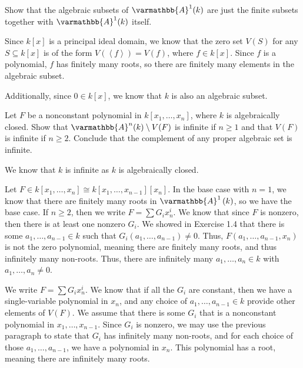 \documentclass[10pt]{mypackage}
\renewcommand*{\mathbb}[1]{\varmathbb{#1}}
\newcommand{\A}{\mathbb{A}}
\begin{document}
\begin{exercise}[Exercise 1.8]
  Show that the algebraic subsets of $\A^1(k)$ are just the finite subsets together with $\A^1(k)$ itself.
\end{exercise}
\begin{solution}
  Since $k\left[x\right]$ is a principal ideal domain, we know that the zero set $V(S)$ for any $S\subseteq k\left[x\right]$ is of the form $V\left(\left\langle f \right\rangle\right) = V\left(f\right)$, where $f\in k\left[x\right]$. Since $f$ is a polynomial, $f$ has finitely many roots, so there are finitely many elements in the algebraic subset.\newline

  Additionally, since $0\in k\left[x\right]$, we know that $k$ is also an algebraic subset.
\end{solution}
\begin{exercise}[Exercise 1.14]
Let $F$ be a nonconstant polynomial in $k\left[x_1,\dots,x_n\right]$, where $k$ is algebraically closed. Show that $\A^n(k)\setminus V(F)$ is infinite if $n\geq 1$ and that $V(F)$ is infinite if $n\geq 2$. Conclude that the complement of any proper algebraic set is infinite.
\end{exercise}
\begin{solution}
  We know that $k$ is infinite as $k$ is algebraically closed.\newline

  Let $F\in k\left[x_1,\dots,x_n\right] \cong k\left[x_1,\dots,x_{n-1}\right]\left[x_n\right]$. In the base case with $n=1$, we know that there are finitely many roots in $\A^1\left(k\right)$, so we have the base case. If $n\geq 2$, then we write $F = \sum G_ix_n^{i}$. We know that since $F$ is nonzero, then there is at least one nonzero $G_i$. We showed in Exercise 1.4 that there is some $a_1,\dots,a_{n-1}\in k$ such that $G_i\left(a_1,\dots,a_{n-1}\right)\neq 0$. Thus, $F\left(a_{1},\dots,a_{n-1},x_n\right)$ is not the zero polynomial, meaning there are finitely many roots, and thus infinitely many non-roots. Thus, there are infinitely many $a_1,\dots,a_n\in k $ with $a_1,\dots,a_n\neq 0$.\newline

  We write $F = \sum G_ix_n^{i}$. We know that if all the $G_i$ are constant, then we have a single-variable polynomial in $x_n$, and any choice of $a_1,\dots,a_{n-1}\in k$ provide other elements of $V(F)$. We assume that there is some $G_i$ that is a nonconstant polynomial in $x_1,\dots,x_{n-1}$. Since $G_i$ is nonzero, we may use the previous paragraph to state that $G_i$ has infinitely many non-roots, and for each choice of those $a_1,\dots,a_{n-1}$, we have a polynomial in $x_n$. This polynomial has a root, meaning there are infinitely many roots.
\end{solution}
\end{document}

